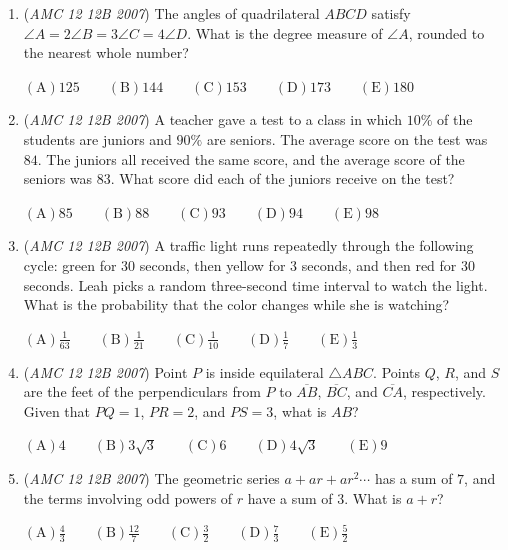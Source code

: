 \begin{enumerate}
 $\mathrm {(A)} 4\qquad \mathrm {(B)} 6\qquad \mathrm {(C)} 8\qquad \mathrm {(D)} 10\qquad \mathrm {(E)} 12$


	\item (\textit{AMC 12 12B 2007}) The angles of quadrilateral $ABCD$ satisfy $\angle A=2\angle B=3\angle C=4\angle D$. What is the degree measure of $\angle A$, rounded to the nearest whole number?


 $\mathrm {(A)} 125\qquad \mathrm {(B)} 144\qquad \mathrm {(C)} 153\qquad \mathrm {(D)} 173\qquad \mathrm {(E)} 180$


	\item (\textit{AMC 12 12B 2007}) A teacher gave a test to a class in which $10\%$ of the students are juniors and $90\%$ are seniors. The average score on the test was $84$. The juniors all received the same score, and the average score of the seniors was $83$. What score did each of the juniors receive on the test?


 $\mathrm {(A)} 85\qquad \mathrm {(B)} 88\qquad \mathrm {(C)} 93\qquad \mathrm {(D)} 94\qquad \mathrm {(E)} 98$


	\item (\textit{AMC 12 12B 2007}) A traffic light runs repeatedly through the following cycle: green for $30$ seconds, then yellow for $3$ seconds, and then red for $30$ seconds. Leah picks a random three-second time interval to watch the light. What is the probability that the color changes while she is watching?


 $\mathrm {(A)} \frac{1}{63}\qquad \mathrm {(B)} \frac{1}{21}\qquad \mathrm {(C)} \frac{1}{10}\qquad \mathrm {(D)} \frac{1}{7}\qquad \mathrm {(E)} \frac{1}{3}$


	\item (\textit{AMC 12 12B 2007}) Point $P$ is inside equilateral $\triangle ABC$. Points $Q$, $R$, and $S$ are the feet of the perpendiculars from $P$ to $\overline{AB}$, $\overline{BC}$, and $\overline{CA}$, respectively. Given that $PQ=1$, $PR=2$, and $PS=3$, what is $AB$?


 $\mathrm {(A)} 4\qquad \mathrm {(B)} 3\sqrt{3}\qquad \mathrm {(C)} 6\qquad \mathrm {(D)} 4\sqrt{3}\qquad \mathrm {(E)} 9$


	\item (\textit{AMC 12 12B 2007}) The geometric series $a+ar+ar^2\cdots$ has a sum of $7$, and the terms involving odd powers of $r$ have a sum of $3$. What is $a+r$?


 $\mathrm {(A)} \frac{4}{3}\qquad \mathrm {(B)} \frac{12}{7}\qquad \mathrm {(C)} \frac{3}{2}\qquad \mathrm {(D)} \frac{7}{3}\qquad \mathrm {(E)} \frac{5}{2}$



\end{enumerate}
